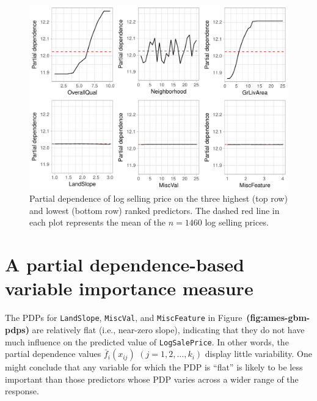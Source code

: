 \documentclass[12pt]{article}
\def\code#1{\texttt{#1}}
\def\ref#1{\textbf{(#1)}}
\begin{document}
\begin{figure}[!htb]
  \centering
  \includegraphics[width=1.0\textwidth]{ames-gbm-pdps}
  \caption{Partial dependence of log selling price on the three highest (top row) and lowest (bottom row) ranked predictors. The dashed red line in each plot represents the mean of the $n = 1460$ log selling prices. \label{fig:ames-gbm-pdps}}
\end{figure}


\section{A partial dependence-based variable importance measure}
\label{sec:new}

The PDPs for \code{LandSlope}, \code{MiscVal}, and \code{MiscFeature} in Figure~\ref{fig:ames-gbm-pdps} are relatively flat (i.e., near-zero slope), indicating that they do not have much influence on the predicted value of \code{LogSalePrice}. In other words, the partial dependence values $\bar{f}_i\left(x_{ij}\right)$ $\left(j = 1, 2, \dots, k_i\right)$ display little variability. One might conclude that any variable for which the PDP is ``flat'' is likely to be less important than those predictors whose PDP varies across a wider range of the response.
\end{document}

